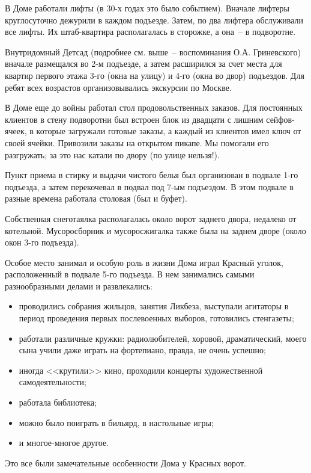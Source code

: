 В Доме работали лифты (в 30-х годах это было событием). Вначале лифтеры круглосуточно дежурили в каждом подъезде. Затем, по два лифтера обслуживали все лифты. Их штаб-квартира располагалась в сторожке, а она~-- в подворотне.

Внутридомный Детсад (подробнее см. выше~-- воспоминания О.А. Гриневского) вначале размещался во 2-м подъезде, а затем  расширился за счет места для квартир первого этажа 3-го (окна на улицу) и 4-го (окна во двор) подъездов. Для ребят всех возрастов организовывались экскурсии по Москве.

В Доме еще до войны работал стол продовольственных заказов. Для постоянных клиентов в стену подворотни был встроен блок из двадцати с лишним сейфов-ячеек, в которые загружали готовые заказы, а каждый из клиентов имел ключ от своей ячейки. Привозили заказы на открытом пикапе. Мы помогали его разгружать; за это нас катали по двору (по улице нельзя!).

Пункт приема в стирку и выдачи чистого белья был организован в подвале 1-го подъезда, а затем перекочевал в подвал под 7-ым подъездом. В этом подвале в разные времена работала столовая (был и буфет).

Собственная снеготаялка располагалась около ворот заднего двора, недалеко от котельной. Мусоросборник и мусоросжигалка также была на заднем дворе (около окон 3-го подъезда).

Особое место занимал и особую роль в жизни Дома играл Красный уголок, расположенный в подвале 5-го подъезда. В нем занимались самыми разнообразными делами и развлекались:

\begin{itemize}
\item проводились собрания жильцов, занятия Ликбеза, выступали агитаторы в период проведения первых послевоенных выборов, готовились стенгазеты;
\item работали различные кружки: радиолюбителей, хоровой, драматический, моего сына учили даже играть на фортепиано, правда, не очень успешно;
\item иногда <<крутили>> кино, проходили концерты художественной самодеятельности;
\item работала библиотека;
\item можно было поиграть в бильярд, в настольные игры;
\item и многое-многое другое.
\end{itemize}

Это все были замечательные особенности Дома у Красных ворот.

